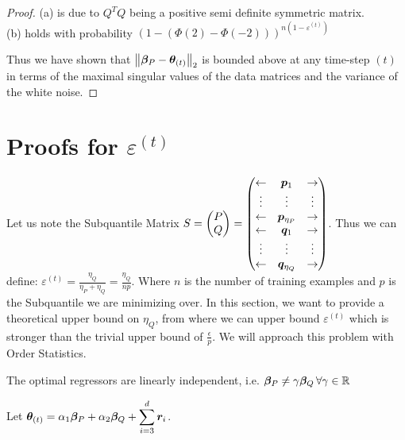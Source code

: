 \documentclass{article} %
\newcommand{\norm}[1]{\left\lVert#1\right\rVert}
\begin{document}
\begin{appendices}
\begin{proof}
	(a) is due to $Q^TQ$ being a positive semi definite symmetric matrix. \\ 
	(b) holds with probability $\left(1 - (\Phi(2) - \Phi(-2))\right)^{n(1-\varepsilon^{(t)})}$
	
	Thus we have shown that $\norm{\vbeta_P - \vtheta_{(t)}}_2$ is bounded above at any time-step $(t)$ in terms of the maximal singular values of the data matrices and the variance of the white noise. 
	
	\end{proof}

	\newpage
	
	\section{Proofs for $\varepsilon^{(t)}$}
	Let us note the Subquantile Matrix $\displaystyle S = \begin{pmatrix} P \\ Q \end{pmatrix} = \begin{pmatrix} \leftarrow & {\bm{p}}_1 & \rightarrow \\ \vdots & \vdots & \vdots \\ \leftarrow & {\bm{p}}_{\eta_P} & \rightarrow \\ \leftarrow & {\bm{q}}_1 & \rightarrow \\ \vdots & \vdots & \vdots \\ \leftarrow & {\bm{q}}_{\eta_Q} & \rightarrow\end{pmatrix}$. Thus we can define: $\displaystyle \varepsilon^{(t)} = \frac{\eta_Q}{\eta_P + \eta_Q} = \frac{\eta_Q}{np}$. Where $n$ is the number of training examples and $p$ is the Subquantile we are minimizing over. In this section, we want to provide a theoretical upper bound on $\eta_Q$, from where we can upper bound $\varepsilon^{(t)}$ which is stronger than the trivial upper bound of $\displaystyle \frac{\epsilon}{p}$. We will approach this problem with Order Statistics.
	\begin{assumption}
		The optimal regressors are linearly independent, i.e. ${\bm{\beta}}_P \neq \gamma {\bm{\beta}}_Q\, \forall \gamma \in \mathbb{R}$
	\end{assumption}
	Let $\displaystyle {\bm{\theta}}_{(t)} = \alpha_1 {\bm{\beta}}_P + \alpha_2 {\bm{\beta}}_Q + \sum_{i=3}^{d}{\bm{r}}_i$.
	

\end{appendices}
\end{document}
